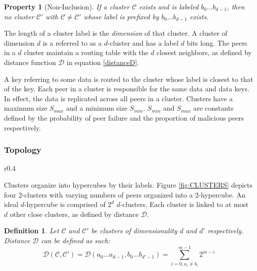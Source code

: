 \documentclass[12pt]{report}
\theoremstyle{plain}
\newtheorem{property}{Property}
\newtheorem{definition}{Definition}
\begin{document}
			\begin{property}[Non-Inclusion]
				\label{non-inclusion}
				If a cluster $\mathcal{C}$ exists and is labeled $b_0...b_{d-1}$, 
				then no cluster $\mathcal{C'}$ with $\mathcal{C} \neq \mathcal{C'}$ whose label is prefixed by $b_0...b_{d-1}$ exists.
			\end{property}

			The length of a cluster label is the \textit{dimension} of that cluster. 
			A cluster of dimension $d$ is a referred to as a $d$-cluster and has a label $d$ bits long.
			The peers in a $d$ cluster maintain a routing table with the $d$ closest neighbors, 
			as defined by distance function $\mathcal{D}$ in equation \ref{distanceD}. 
			
			A key referring to some data is routed to the cluster whose label is closest to that of the key.
			Each peer in a cluster is responsible for the same data and data keys.
			In effect, the data is replicated across all peers in a cluster.
			Clusters have a maximum size $S_{max}$ and a minimum size $S_{min}$.
			$S_{min}$ and $S_{max}$ are constants defined by the probability of peer failure and the proportion of malicious peers respectively.

		\subsubsection*{Topology}

	    \begin{wrapfigure}{r}{0.4\columnwidth}
		    \hspace*{-0.05\linewidth}
		    \centering
			
		    \captionsetup{justification=centering}
		    \caption{Clusters organized \\in a 2-hypercube}
		    \label{fig:CLUSTERS}
	    \end{wrapfigure}

			Clusters organize into hypercubes by their labels. 
			Figure \ref{fig:CLUSTERS} depicts four 2-clusters with varying numbers of peers organized into a 2-hypercube. 
			An ideal $d$-hypercube is comprised of $2^d$ $d$-clusters. 
			Each cluster is linked to at most $d$ other close clusters, as defined by distance $\mathcal{D}$. 
			

			
			\begin{definition}
				Let $\mathcal{C}$ and $\mathcal{C'}$ be clusters of dimensionality $d$ and $d'$ respectively. Distance $\mathcal{D}$ can be defined as such:
				\begin{equation}
					\label{distanceD}
					\mathcal{D(C,C')} = \mathcal{D}(a_0...a_{d-1}, b_0...b_{d'-1})=\sum\limits_{i=0,a_i \neq b_i}^{m-1} 2^{m-i}
				\end{equation}
			\end{definition}
\end{document}
